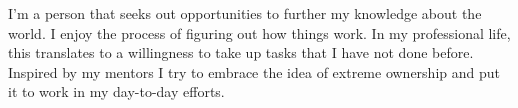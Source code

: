 \documentclass[10pt,a4paper,ragged2e]{altacv}
\begin{document}

\begin{fullwidth}
\makecvheader
\end{fullwidth}



I'm a person that seeks out opportunities to further my knowledge about the world.
I enjoy the process of figuring out how things work. In my professional life,
this translates to a willingness to take up tasks that I have not done before.
Inspired by my mentors I try to embrace the idea of extreme ownership and put it to work in my day-to-day efforts.

\end{document}
